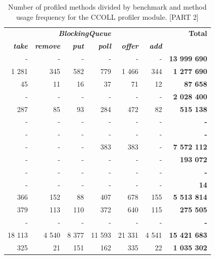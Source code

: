 \documentclass[]{usiinfthesis}
\begin{document}
\begin{table}
\centering
\caption[Method Usage Frequencies for CCOLL pt.2]{Number of profiled methods divided by benchmark and method usage frequency for the CCOLL profiler module.  [PART 2]}
\label{tab:5}
\begin{tabular}{|r|r|r|r|r|r|r|}
\hline
 \multicolumn{6}{|c|}{\textbf{\textit{BlockingQueue}}} & \textbf{ 	 Total 	 }\\
 \textbf{\textit{ 	 take 	 }}&\textbf{\textit{ 	 remove 	 }}&\textbf{\textit{ 	 put 	 }}&\textbf{\textit{ 	 poll 	 }}&\textbf{\textit{ 	 offer 	 }}&\textbf{\textit{ 	 add 	 }}& \\\hline 
	 -   	 & 	 -   	 & 	 -   	 & 	 -   	 & 	 -   	 & 	 -   	 &\textbf{ 	 13 999 690 	 }\\ 
	 1 281 	 & 	 345 	 & 	 582 	 & 	 779 	 & 	 1 466 	 & 	 344 	 &\textbf{ 	 1 277 690 	 }\\ 
	 45 	 & 	 11 	 & 	 16 	 & 	 37 	 & 	 71 	 & 	 12 	 &\textbf{ 	 87 658 	 }\\ 
	 -   	 & 	 -   	 & 	 -   	 & 	 -   	 & 	 -   	 & 	 -   	 &\textbf{ 	 2 028 400 	 }\\ 
	 287 	 & 	 85 	 & 	 93 	 & 	 284 	 & 	 472 	 & 	 82 	 &\textbf{ 	 515 138 	 }\\ 
	 -   	 & 	 -   	 & 	 -   	 & 	 -   	 & 	 -   	 & 	 -   	 &\textbf{ 	 -   	 }\\ 
	 -   	 & 	 -   	 & 	 -   	 & 	 -   	 & 	 -   	 & 	 -   	 &\textbf{ 	 -   	 }\\ 
	 -   	 & 	 -   	 & 	 -   	 & 	 383 	 & 	 383 	 & 	 -   	 &\textbf{ 	 7 572 112 	 }\\ 
	 -   	 & 	 -   	 & 	 -   	 & 	 -   	 & 	 -   	 & 	 -   	 &\textbf{ 	 193 072 	 }\\ 
	 -   	 & 	 -   	 & 	 -   	 & 	 -   	 & 	 -   	 & 	 -   	 &\textbf{ 	 -   	 }\\ 
	 -   	 & 	 -   	 & 	 -   	 & 	 -   	 & 	 -   	 & 	 -   	 &\textbf{ 	 14 	 }\\ 
	 366 	 & 	 152 	 & 	 88 	 & 	 407 	 & 	 678 	 & 	 155 	 &\textbf{ 	 5 513 814 	 }\\ 
	 379 	 & 	 113 	 & 	 110 	 & 	 372 	 & 	 640 	 & 	 115 	 &\textbf{ 	 275 505 	 }\\ 
	 -   	 & 	 -   	 & 	 -   	 & 	 -   	 & 	 -   	 & 	 -   	 &\textbf{ 	 -   	 }\\ 
	 18 113 	 & 	 4 540 	 & 	 8 377 	 & 	 11 593 	 & 	 21 331 	 & 	 4 541 	 &\textbf{ 	 15 421 683 	 }\\ 
	 325 	 & 	 21 	 & 	 151 	 & 	 162 	 & 	 335 	 & 	 22 	 &\textbf{ 	 1 035 302 	 }\\ 

\end{tabular}
\end{table}
\end{document}
